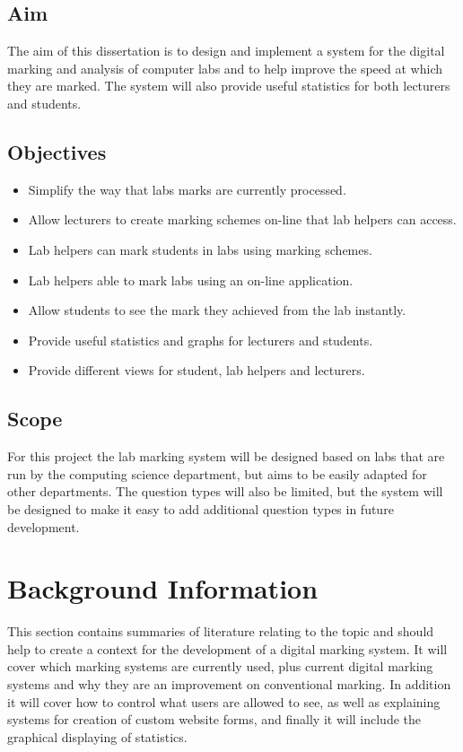 \documentclass[11pt]{report}
\begin{document}
\section{Aim}
The aim of this dissertation is to design and implement a system for the digital marking and analysis of computer labs and to help improve the speed at which they are marked. The system will also provide useful statistics for both lecturers and students.

\section{Objectives}
\label{section:object}
\begin{itemize}
\item Simplify the way that labs marks are currently processed.
\item Allow lecturers to create marking schemes on-line that lab helpers can access. 
\item Lab helpers can mark students in labs using marking schemes.
\item Lab helpers able to mark labs using an on-line application.
\item Allow students to see the mark they achieved from the lab instantly.
\item Provide useful statistics and graphs for lecturers and students.
\item Provide different views for student, lab helpers and lecturers.
\end{itemize}



\section{Scope}

For this project the lab marking system will be designed based on labs that are run by the computing science department, but aims to be easily adapted for other departments. The question types will also be limited, but the system will be designed to make it easy to add additional question types in future development.




\newpage
\chapter{Background Information}
This section contains summaries of literature relating to the topic and should help to create a context for the development of a digital marking system. It will cover which marking systems are currently used, plus  current digital marking systems  and why they are an improvement on conventional marking. In addition it will cover how to control what users are allowed to see, as well as explaining systems for creation of custom website forms, and finally it will include the graphical displaying of statistics. 
\end{document}
